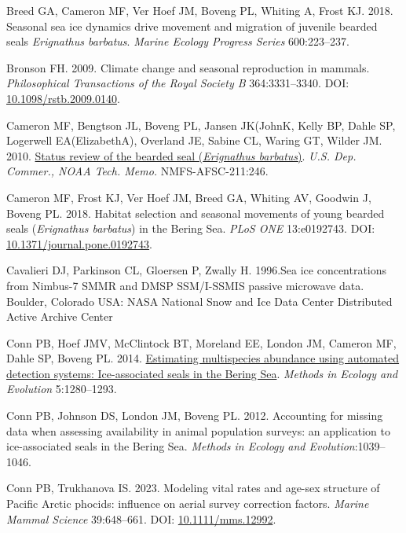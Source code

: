 \documentclass[fleqn,10pt,lineno]{wlpeerj} %
\newlength{\cslhangindent}
\newenvironment{CSLReferences}[2] %
 {\begin{list}{}{%
  \setlength{\itemindent}{0pt}
  \setlength{\leftmargin}{0pt}
  \setlength{\parsep}{0pt}
  \ifodd #1
   \setlength{\leftmargin}{\cslhangindent}
   \setlength{\itemindent}{-1\cslhangindent}
  \fi
  \setlength{\itemsep}{#2\baselineskip}}}
 {\end{list}}
\begin{document}
\begin{CSLReferences}{1}{0}
Breed GA, Cameron MF, Ver Hoef JM, Boveng PL, Whiting A, Frost KJ. 2018. Seasonal sea ice dynamics drive movement and migration of juvenile bearded seals \emph{Erignathus barbatus}. \emph{Marine Ecology Progress Series} 600:223--237.

Bronson FH. 2009. Climate change and seasonal reproduction in mammals. \emph{Philosophical Transactions of the Royal Society B} 364:3331--3340. DOI: \href{https://doi.org/10.1098/rstb.2009.0140}{10.1098/rstb.2009.0140}.

Cameron MF, Bengtson JL, Boveng PL, Jansen JK(JohnK, Kelly BP, Dahle SP, Logerwell EA(ElizabethA), Overland JE, Sabine CL, Waring GT, Wilder JM. 2010. \href{https://repository.library.noaa.gov/view/noaa/3761}{Status review of the bearded seal (\emph{Erignathus barbatus})}. \emph{U.S. Dep. Commer., NOAA Tech. Memo.} NMFS-AFSC-211:246.

Cameron MF, Frost KJ, Ver Hoef JM, Breed GA, Whiting AV, Goodwin J, Boveng PL. 2018. Habitat selection and seasonal movements of young bearded seals (\emph{Erignathus barbatus}) in the Bering Sea. \emph{PLoS ONE} 13:e0192743. DOI: \href{https://doi.org/10.1371/journal.pone.0192743}{10.1371/journal.pone.0192743}.

Cavalieri DJ, Parkinson CL, Gloersen P, Zwally H. 1996.Sea ice concentrations from Nimbus-7 SMMR and DMSP SSM/I-SSMIS passive microwave data. Boulder, Colorado USA: NASA National Snow and Ice Data Center Distributed Active Archive Center

Conn PB, Hoef JMV, McClintock BT, Moreland EE, London JM, Cameron MF, Dahle SP, Boveng PL. 2014. \href{https://onlinelibrary.wiley.com/doi/abs/10.1111/2041-210X.12127}{Estimating multispecies abundance using automated detection systems: Ice-associated seals in the Bering Sea}. \emph{Methods in Ecology and Evolution} 5:1280--1293.

Conn PB, Johnson DS, London JM, Boveng PL. 2012. Accounting for missing data when assessing availability in animal population surveys: an application to ice-associated seals in the Bering Sea. \emph{Methods in Ecology and Evolution}:1039--1046.

Conn PB, Trukhanova IS. 2023. Modeling vital rates and age-sex structure of Pacific Arctic phocids: influence on aerial survey correction factors. \emph{Marine Mammal Science} 39:648--661. DOI: \href{https://doi.org/10.1111/mms.12992}{10.1111/mms.12992}.


\end{CSLReferences}
\end{document}
